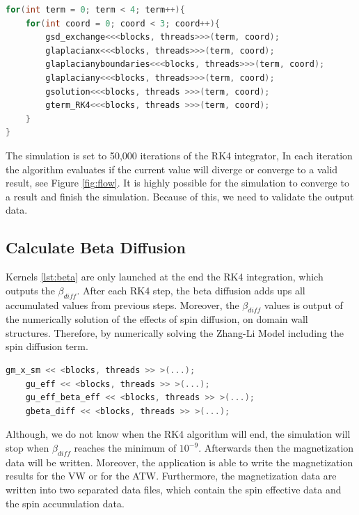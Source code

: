 \begin{lstlisting}[language=C++, label={lst:rk4}, caption={Summarize of Runge and Kutta 4th Integration}]
for(int term = 0; term < 4; term++){
	for(int coord = 0; coord < 3; coord++){
    	gsd_exchange<<<blocks, threads>>>(term, coord);
    	glaplacianx<<<blocks, threads>>>(term, coord);
    	glaplacianyboundaries<<<blocks, threads>>>(term, coord);
    	glaplaciany<<<blocks, threads>>>(term, coord);
    	gsolution<<<blocks, threads >>>(term, coord);
    	gterm_RK4<<<blocks, threads >>>(term, coord);
    }
}
\end{lstlisting}

 The simulation is set to 50,000 iterations of the RK4 integrator, In each iteration the algorithm evaluates if the current value will diverge or converge to a valid result, see Figure \ref{fig:flow}. It is highly possible for the simulation to converge to a result and finish the simulation. Because of this, we need to validate the output data.
 
\subsection{Calculate Beta Diffusion}

Kernels \ref{lst:beta} are only launched at the end the RK4 integration, which outputs the $\beta_{diff}$. After each RK4 step, the beta diffusion adds ups all accumulated values from previous steps. Moreover, the $\beta_{diff}$ values is output of the numerically solution of the effects of spin diffusion, on domain wall structures. Therefore, by numerically solving the Zhang-Li Model including the spin diffusion term.

\begin{lstlisting}[language=C++, label={lst:beta}, caption={Calculate beta diffusion }]
    gm_x_sm << <blocks, threads >> >(...); 
    gu_eff << <blocks, threads >> >(...); 
    gu_eff_beta_eff << <blocks, threads >> >(...); 	
    gbeta_diff << <blocks, threads >> >(...);               
\end{lstlisting}

Although, we do not know when the RK4 algorithm will end, the simulation will stop when $\beta_{diff}$ reaches the minimum of $10^{-9}$. Afterwards then the magnetization data will be written. Moreover, the application is able to write the magnetization results for the VW or for the ATW. Furthermore, the magnetization data are written into two separated data files, which contain the spin effective data and the spin accumulation data.

